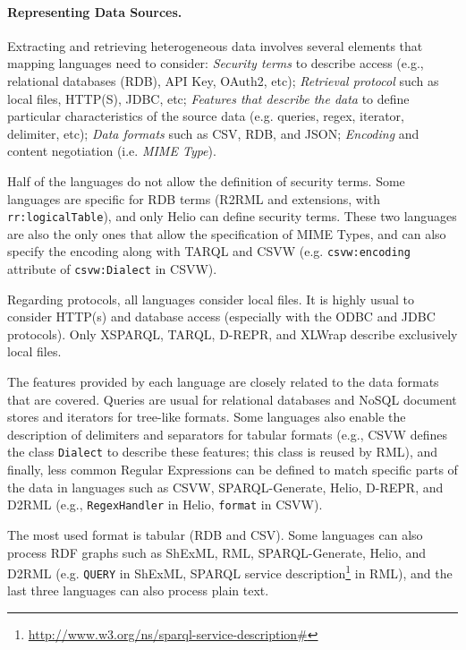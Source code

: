 \noindent\paragraph{\textbf{Representing Data Sources.}} Extracting and retrieving heterogeneous data involves several elements that mapping languages need to consider: \textit{Security terms} to describe access (e.g., relational databases (RDB), API Key, OAuth2, etc); \textit{Retrieval protocol} such as local files, HTTP(S), JDBC, etc; \textit{Features that describe the data} to define particular characteristics of the source data (e.g. queries, regex, iterator, delimiter, etc); \textit{Data formats} such as CSV, RDB, and JSON; \textit{Encoding} and content negotiation (i.e. \textit{MIME Type}). 

Half of the languages do not allow the definition of security terms. Some languages are specific for RDB terms (R2RML and extensions, with \texttt{rr:logical\-Table}), and only Helio can define security terms. These two languages are also the only ones that allow the specification of MIME Types, and can also specify the encoding along with TARQL and CSVW (e.g. \texttt{csvw:encoding} attribute of \texttt{csvw:Dialect} in CSVW). 

Regarding protocols, all languages consider local files. It is highly usual to consider HTTP(s) and database access (especially with the ODBC and JDBC protocols). Only XSPARQL, TARQL, D-REPR, and XLWrap describe exclusively local files. 

The features provided by each language are closely related to the data formats that are covered. Queries are usual for relational databases and NoSQL document stores and iterators for tree-like formats. Some languages also enable the description of delimiters and separators for tabular formats (e.g., CSVW defines the class \texttt{Dialect} to describe these features; this class is reused by RML), and finally, less common Regular Expressions can be defined to match specific parts of the data in languages such as CSVW, SPARQL-Generate, Helio, D-REPR, and D2RML (e.g., \texttt{RegexHandler} in Helio, \texttt{format} in CSVW). 

The most used format is tabular (RDB and CSV). Some languages can also process RDF graphs such as ShExML, RML, SPARQL-Generate, Helio, and D2RML (e.g. \texttt{QUERY} in ShExML,  SPARQL service description\footnote{\url{http://www.w3.org/ns/sparql-service-description\#}} in RML), and the last three languages can also process plain text.


